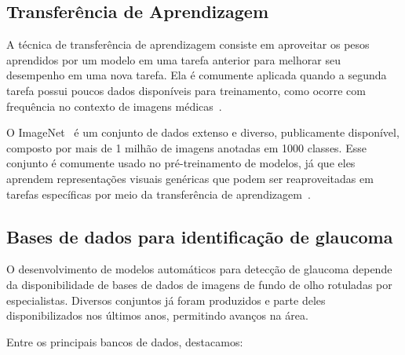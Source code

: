 \documentclass[12pt]{article}
\begin{document}
%

\subsection{Transferência de Aprendizagem}
\label{sec:transfer_learning}

A técnica de transferência de aprendizagem consiste em aproveitar os pesos aprendidos por um modelo em uma tarefa anterior para melhorar seu desempenho em uma nova tarefa. Ela é comumente aplicada quando a segunda tarefa possui poucos dados disponíveis para treinamento, como ocorre com frequência no contexto de imagens médicas~\cite{matsoukas2022}.

O ImageNet~\cite{imagenet} é um conjunto de dados extenso e diverso, publicamente disponível, composto por mais de 1 milhão de imagens anotadas em 1000 classes. Esse conjunto é comumente usado no pré-treinamento de modelos, já que eles aprendem representações visuais genéricas que podem ser reaproveitadas em tarefas específicas por meio da transferência de aprendizagem~\cite{matsoukas2022}.

\subsection{Bases de dados para identificação de glaucoma}
\label{sec:review:datasets}

O desenvolvimento de modelos automáticos para detecção de glaucoma depende da disponibilidade de bases de dados de imagens de fundo de olho rotuladas por especialistas. Diversos conjuntos já foram produzidos e parte deles disponibilizados nos últimos anos, permitindo avanços na área.

Entre os principais bancos de dados, destacamos:
\end{document}
